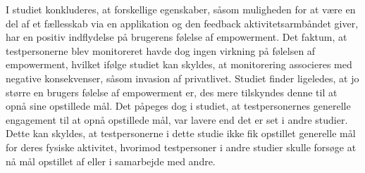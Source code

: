 I studiet konkluderes, at forskellige egenskaber, såsom muligheden for at være en del af et fællesskab via en applikation og den feedback aktivitetsarmbåndet giver, har en positiv indflydelse på brugerens følelse af empowerment. Det faktum, at testpersonerne blev monitoreret havde dog ingen virkning på følelsen af empowerment, hvilket ifølge studiet kan skyldes, at monitorering associeres med negative konsekvenser, såsom invasion af privatlivet.
Studiet finder ligeledes, at jo større en brugers følelse af empowerment er, des mere tilskyndes denne til at opnå sine opstillede mål. Det påpeges dog i studiet, at testpersonernes generelle engagement til at opnå opstillede mål, var lavere end det er set i andre studier. Dette kan skyldes, at testpersonerne i dette studie ikke fik opstillet generelle mål for deres fysiske aktivitet, hvorimod testpersoner i andre studier skulle forsøge at nå mål opstillet af eller i samarbejde med andre. 
